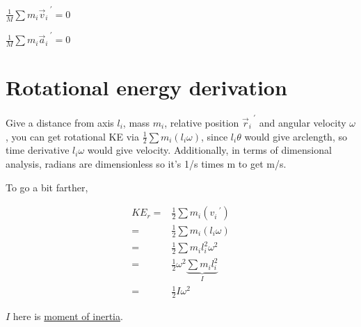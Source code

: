 \documentclass[letterpaper]{article}
\begin{document}
\(\frac{1}{M} \sum m_i \vec{v}_i^{\text{ }\prime} = 0\)

\(\frac{1}{M} \sum m_i \vec{a}_i^{\text{ }\prime} = 0\)


\section{Rotational energy derivation}
\label{sec:orgfbd919b}

Give a distance from axis \(l_i\), mass \(m_i\), relative position \(\vec{r}_i^{\text{ }\prime}\) and angular velocity \(\omega\), you can get rotational KE via \(\frac{1}{2} \sum m_i ( l_i \omega)\), since \(l_i \theta\) would give arclength, so time derivative \(l_i \omega\) would give velocity. Additionally, in terms of dimensional analysis, radians are dimensionless so it's 1/s times m to get m/s.

To go a bit farther,

\begin{align*}
KE_r =& \frac{1}{2} \sum m_i (v_i^{\text{ }\prime}) \\
=&  \frac{1}{2} \sum m_i (l_i \omega) \\
=&  \frac{1}{2} \sum m_i l_i^2 \omega^2 \\
=&  \frac{1}{2} \omega^2 \underbrace{ \sum m_i l_i^2}_{I} \\
=& \frac{1}{2} I \omega^2
\end{align*}

\(I\) here is \href{20210910132702-moment\_of\_inertia.org}{moment of inertia}. 
\end{document}
